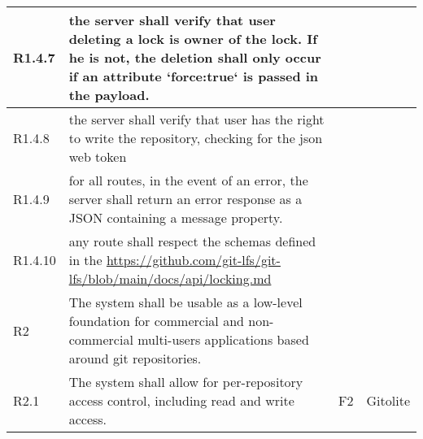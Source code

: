 \begin{landscape}
\begin{longtable}{|p{1cm}|p{19cm}|p{2cm}|p{3cm}|}
        R1.4.7                              & the server shall verify that user deleting a lock is owner of the lock. If he is not, the deletion shall only occur if an attribute `force:true` is passed in the payload.                                                                                                            &                       &                                          \\\hline
        R1.4.8                              & the server shall verify that user has the right to write the repository, checking for the json web token                                                                                                                                                                              &                       &                                          \\\hline
        R1.4.9                              & for all routes, in the event of an error, the server shall return an error response as a JSON containing a message property.                                                                                                                                                          &                       &                                          \\\hline
        R1.4.10                             & any route shall respect the schemas defined in the \url{https://github.com/git-lfs/git-lfs/blob/main/docs/api/locking.md}                                                                                                                                                             &                       &                                          \\\hline
        \rowcolor[HTML]{C0C0C0}        R2   & The system shall be usable as a low-level foundation for commercial and non-commercial multi-users applications based around git repositories.                                                                                                                                        &                       &                                          \\ \hline
        \rowcolor[HTML]{DDDDDD}        R2.1 & The system shall allow for per-repository access control, including read and write access.                                                                                                                                                                                            & F2                    & Gitolite                                 \\ \hline

\end{longtable}
\end{landscape}
